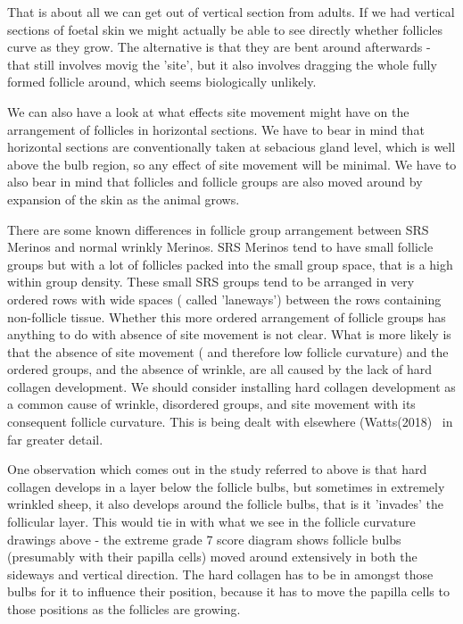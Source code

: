 \documentclass[titlepage]{article}  %
\begin{document}
That is about all we can get out of vertical section from adults. If we had vertical sections of foetal skin we might actually be able to see directly whether follicles curve as they grow. The alternative is that they are bent around afterwards - that still involves movig the 'site', but it also involves dragging the whole fully formed follicle around, which seems biologically unlikely.

We can also have a look at what effects site movement might have on the arrangement of follicles in horizontal sections. We have to bear in mind that horizontal sections are conventionally taken at sebacious gland level, which is well above the bulb region, so any effect of site movement will be minimal. We have to also bear in mind that  follicles and follicle groups are also moved around by expansion of the skin as the animal grows. 

There are some known differences in follicle group arrangement between SRS Merinos and normal wrinkly Merinos.  SRS Merinos tend to have small follicle groups but with a lot of follicles packed into the small group space, that is a high within group density. These small SRS groups tend to be arranged in very ordered rows with wide spaces ( called 'laneways') between the rows containing non-follicle tissue. Whether this more ordered arrangement of follicle groups has  anything to do with absence of site movement is not clear.  What is more likely is that the absence of site movement ( and therefore low follicle curvature) and the ordered groups, and the absence of wrinkle, are all caused by the lack of hard collagen development.  We should consider installing  hard collagen development as a common cause of wrinkle, disordered groups, and site movement with its consequent follicle curvature. This is being dealt with elsewhere (Watts(2018)~\cite{watt:18} in far greater detail.

One observation which comes out in the study referred to above is that hard collagen develops in a layer below the follicle bulbs, but sometimes in extremely wrinkled sheep, it also develops around the follicle bulbs, that is it 'invades' the follicular layer. This would tie in with what we see in the follicle curvature drawings above - the extreme grade 7 score diagram shows follicle bulbs (presumably with their papilla cells) moved around extensively in both the sideways and vertical direction. The hard collagen has to be in amongst those bulbs for it to influence their position, because it has to move the papilla cells to those positions as the follicles are growing.
\end{document}

